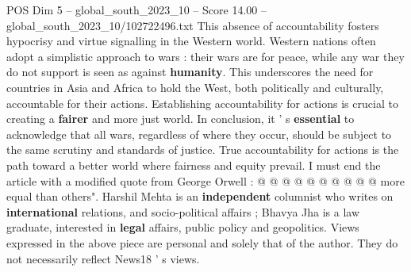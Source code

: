 \begin{textsample}{POS Dim 5 – global\_south\_2023\_10 – Score 14.00 – global\_south\_2023\_10/102722496.txt}
This absence of accountability fosters hypocrisy and virtue signalling in the Western world.
Western nations often adopt a simplistic approach to wars : their wars are for peace, while any war they do not support is seen as against \textbf{humanity}.
This underscores the need for countries in Asia and Africa to hold the West, both politically and culturally, accountable for their actions.
Establishing accountability for actions is crucial to creating a \textbf{fairer} and more just world.
In conclusion, it ' s \textbf{essential} to acknowledge that all wars, regardless of where they occur, should be subject to the same scrutiny and standards of justice.
True accountability for actions is the path toward a better world where fairness and equity prevail.
I must end the article with a modified quote from George Orwell : @ @ @ @ @ @ @ @ @ @ more equal than others".
Harshil Mehta is an \textbf{independent} columnist who writes on \textbf{international} relations, and socio-political affairs ; Bhavya Jha is a law graduate, interested in \textbf{legal} affairs, public policy and geopolitics.
Views expressed in the above piece are personal and solely that of the author.
They do not necessarily reflect News18 ' s views.

\end{textsample}
